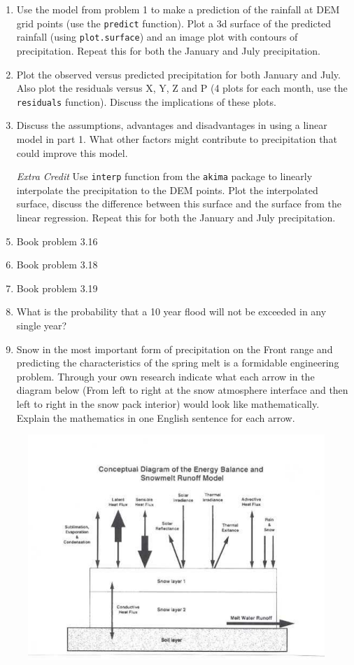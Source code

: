 \documentclass[11pt]{article}
\begin{document}
\begin{enumerate}
\item Use the model from problem 1 to make a prediction of the rainfall at DEM grid points (use the \texttt{predict} function).  Plot a 3d surface of the predicted rainfall (using \texttt{plot.surface}) and an image plot with contours of precipitation. Repeat this for both the January and July precipitation. 

\item Plot the observed versus predicted precipitation for both January and July. Also plot the residuals versus X, Y, Z and P (4 plots for each month, use the \texttt{residuals} function). Discuss the implications of these plots. 

\item Discuss the assumptions, advantages and disadvantages in using a linear model in part 1.  What other factors might contribute to precipitation that could improve this model. 

\item[{\it Extra Credit}] Use \texttt{interp} function from the \texttt{akima} package to linearly interpolate the precipitation to the DEM points.  Plot the interpolated surface, discuss the difference between this surface and the surface from the linear regression. Repeat this for both the January and July precipitation. 

\item Book problem 3.16
\item Book problem 3.18
\item Book problem 3.19
\item What is the probability that a 10 year flood will not be exceeded in any single year?
\item Snow in the most important form of precipitation on the Front range and predicting the characteristics of the spring melt is a formidable engineering problem. Through your own research indicate what each arrow in the diagram below (From left to right at the snow atmosphere interface and then left to right in the snow pack interior) would look like mathematically. Explain the mathematics in one English sentence for each arrow.

\end{enumerate}

\begin{figure}[htbp] %
   \centering
   \includegraphics{snowmodel.pdf} 
\end{figure}
\end{document}

